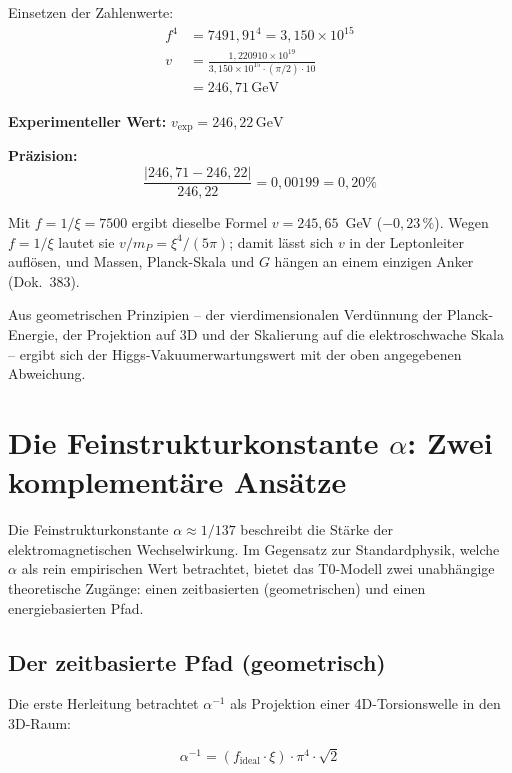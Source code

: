 	Einsetzen der Zahlenwerte:
	\begin{align}
		f^4 &= 7491{,}91^4 = 3{,}150 \times 10^{15} \\
		v &= \frac{1{,}220910 \times 10^{19}}{3{,}150 \times 10^{15} \cdot (\pi/2) \cdot 10} \\
		&= 246{,}71\,\text{GeV}
	\end{align}
	
	\textbf{Experimenteller Wert:} \(v_{\exp} = 246{,}22\,\text{GeV}\)
	
	\textbf{Präzision:}
	\begin{equation}
		\frac{|246{,}71 - 246{,}22|}{246{,}22} = 0{,}00199 = 0{,}20\%
	\end{equation}

	Mit $f = 1/\xi = 7500$ ergibt dieselbe Formel $v = 245{,}65$~GeV ($-0{,}23\,\%$). Wegen $f = 1/\xi$ lautet sie $v/m_P = \xi^4/(5\pi)$; damit lässt sich $v$ in der Leptonleiter auflösen, und Massen, Planck-Skala und $G$ hängen an einem einzigen Anker (Dok.~383).
	
	Aus geometrischen Prinzipien -- der vierdimensionalen Verdünnung der Planck-Energie, der Projektion auf 3D und der Skalierung auf die elektroschwache Skala -- ergibt sich der Higgs-Vakuumerwartungswert mit der oben angegebenen Abweichung.
	
	\section{Die Feinstrukturkonstante \(\alpha\): Zwei komplementäre Ansätze}
	
	Die Feinstrukturkonstante \(\alpha \approx 1/137\) beschreibt die Stärke der elektromagnetischen Wechselwirkung. Im Gegensatz zur Standardphysik, welche \(\alpha\) als rein empirischen Wert betrachtet, bietet das T0-Modell zwei unabhängige theoretische Zugänge: einen zeitbasierten (geometrischen) und einen energiebasierten Pfad.
	
	\subsection{Der zeitbasierte Pfad (geometrisch)}
	
	Die erste Herleitung betrachtet \(\alpha^{-1}\) als Projektion einer 4D-Torsionswelle in den 3D-Raum:
	
	\begin{equation}
		\boxed{\alpha^{-1} = (f_{\text{ideal}} \cdot \xi) \cdot \pi^4 \cdot \sqrt{2}}
	\end{equation}
	
